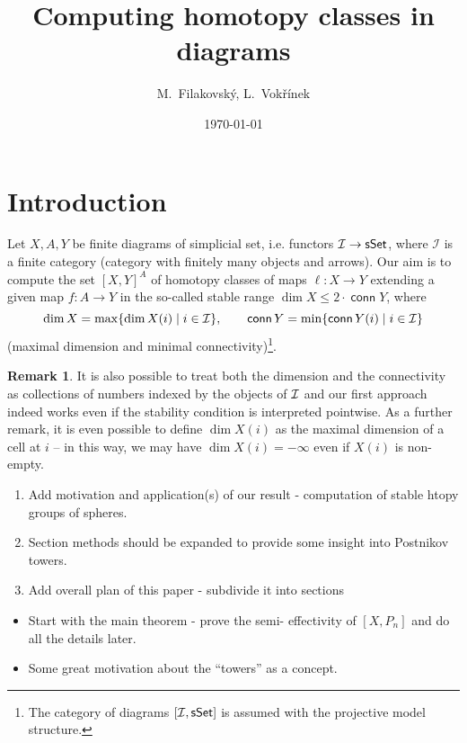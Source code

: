\documentclass[12pt,a4wide]{article}
\theoremstyle{plain}
\theoremstyle{definition}
\newtheorem{remark}[thm]{Remark}
\newcommand{\conn}{\mathop{\mathsf{conn}}}
\renewcommand\:{\colon}
\newcommand{\icat}{\mathcal I}
\begin{document}
\author{M.\ Filakovsk\'{y}, L.\ Vok\v{r}\'{i}nek}
\title{Computing homotopy classes in diagrams}
\date{\today}
\maketitle

\section{Introduction}
Let $X,A,Y$ be finite diagrams of simplicial set, i.e. functors $\icat \to \sSet$, where $\icat$ is a finite category (category with finitely many objects and arrows).
Our aim is to compute the set $[X, Y]^A$ of homotopy classes of maps $\ell \colon X \to Y$ extending a given map $f \colon A \to Y$ in the so-called stable range $\dim X \leq 2 \cdot \conn Y$, where
\[\dim X = \max \{ \dim X(i) \mid i \in \mcI \}, \qquad \conn Y = \min \{ \conn Y(i) \mid i \in \mcI \}\]
(maximal dimension and minimal connectivity)\footnote{The category of diagrams  $[\icat, \sSet]$ is assumed with the projective model structure.}. 

\begin{remark}\label{rem:pointwise}
It is also possible to treat both the dimension and the connectivity as collections of numbers indexed by the objects of $\mathcal I$ and our first approach indeed works even if the stability condition is interpreted pointwise. As a further remark, it is even possible to define $\dim X(i)$ as the maximal dimension of a cell at $i$ -- in this way, we may have $\dim X(i) = -\infty$ even if $X(i)$ is non-empty.
\end{remark}

{\color{red}
\begin{enumerate}
\item Add motivation and application(s) of our result - computation of stable htopy groups of spheres.
\item Section methods should be expanded to provide some insight into Postnikov towers.
\item Add overall plan of this paper - subdivide it into sections 
\end{enumerate}
}

\begin{itemize}
\item Start with the main theorem - prove the semi- effectivity of $[X, P_n]$ and do all the details later.
\item Some great motivation about the ``towers'' as a concept.
\end{itemize}
\end{document}
